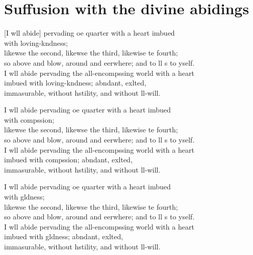 
\clearpage

\chapter[Divine abidings]{Suffusion with the divine abidings}                                          %

\begin{leader}
\end{leader}

[I wll abide] pervading oe quarter with a heart imbued\\
\vin with loving-kndness;\\
likewse the second, likewse the third, likewise te fourth;\\
so above and blow, around and eerwhere; and to ll s to yself.\\
I wll abide pervading the all-encompssing world with a heart \\
imbued with loving-kndness; abndant, exlted,\\
\vin immasurable, without hstility, and without ll-will.

I wll abide pervading oe quarter with a heart imbued\\
\vin with compssion;\\
likewse the second, likewse the third, likewise te fourth;\\
so above and blow, around and eerwhere; and to ll s to yself.\\
I wll abide pervading the all-encompssing world with a heart \\
imbued with compssion; abndant, exlted,\\
\vin immasurable, without hstility, and without ll-will.

I wll abide pervading oe quarter with a heart imbued\\
\vin with gldness;\\
likewse the second, likewse the third, likewise te fourth;\\
so above and blow, around and eerwhere; and to ll s to yself.\\
I wll abide pervading the all-encompssing world with a heart \\
imbued with gldness; abndant, exlted,\\
\vin immasurable, without hstility, and without ll-will.


